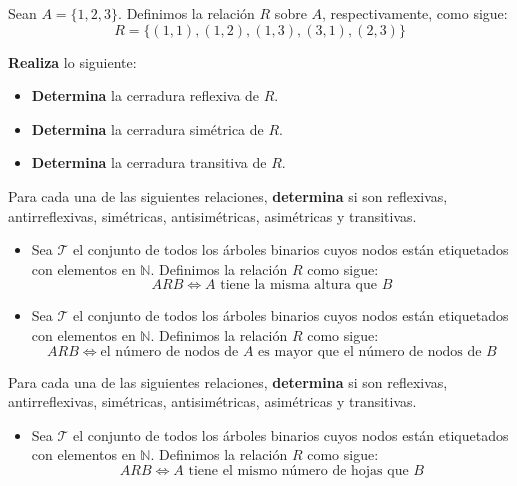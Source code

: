 \documentclass[oneside]{style}
\begin{document}
\begin{questions}[label=\protect\circled{\bfseries\arabic*}]
    \question
    {
        Sean $A = \{1,2,3\}$. Definimos la relación $R$ sobre $A$, 
        respectivamente, como sigue: 
        \begin{equation*}
            R = \{(1,1), (1,2), (1,3), (3,1), (2,3)\}
        \end{equation*}

        \textbf{Realiza} lo siguiente:
        \begin{itemize}
            \item \textbf{Determina} la cerradura reflexiva de $R$.
            \item \textbf{Determina} la cerradura simétrica de $R$.
            \item \textbf{Determina} la cerradura transitiva de $R$.
        \end{itemize}
    }

    \question
    {
        Para cada una de las siguientes relaciones, \textbf{determina} si son 
        reflexivas, antirreflexivas, simétricas, antisimétricas, asimétricas y 
        transitivas. 
        \begin{itemize}
            \item Sea $\mathcal{T}$ el conjunto de todos los árboles binarios 
            cuyos nodos están etiquetados con elementos en $\mathbb{N}$. 
            Definimos la relación $R$ como sigue: 
            \begin{equation*}
                ARB \Leftrightarrow A \text{ tiene la misma altura que } B
            \end{equation*} 

            \item Sea $\mathcal{T}$ el conjunto de todos los árboles binarios 
            cuyos nodos están etiquetados con elementos en $\mathbb{N}$. 
            Definimos la relación $R$ como sigue: 
            \begin{equation*}
                ARB \Leftrightarrow \text{el número de nodos de } A \text{ es 
                mayor que el número de nodos de } B
            \end{equation*} 
        \end{itemize}
    }

    \question
    {
        Para cada una de las siguientes relaciones, \textbf{determina} si son 
        reflexivas, antirreflexivas, simétricas, antisimétricas, asimétricas y 
        transitivas. 
        \begin{itemize}
            \item Sea $\mathcal{T}$ el conjunto de todos los árboles binarios 
            cuyos nodos están etiquetados con elementos en $\mathbb{N}$. 
            Definimos la relación $R$ como sigue: 
            \begin{equation*}
                ARB \Leftrightarrow A \text{ tiene el mismo número de hojas que } 
                B
            \end{equation*} 


\end{itemize}}
\end{questions}
\end{document}
